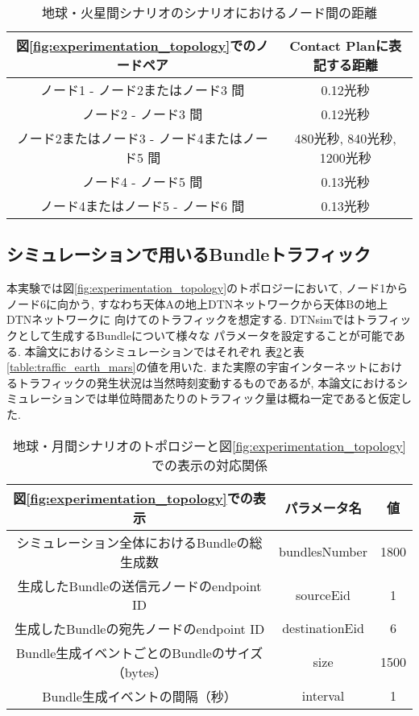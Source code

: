 \begin{table}[htbp]
    \centering
    \caption{地球・火星間シナリオのシナリオにおけるノード間の距離}
    \vspace{3mm}
    \begin{tabular}{cc}  \hline
        図\ref{fig:experimentation_topology}でのノードペア & Contact Planに表記する距離 \\ \hline
        ノード1 - ノード2またはノード3 間　& 0.12光秒 \\
        ノード2 - ノード3 間 & 0.12光秒 \\
        ノード2またはノード3 - ノード4またはノード5  間 & 480光秒, 840光秒, 1200光秒 \\
        ノード4 - ノード5  間 & 0.13光秒 \\
        ノード4またはノード5 - ノード6  間 & 0.13光秒 \\ \hline
    \end{tabular}
    \label{table:earth_mars_scenario_distance}
\end{table}

\subsection{シミュレーションで用いるBundleトラフィック}
\label{section:シミュレーションで用いるBundleトラフィック}
本実験では図\ref{fig:experimentation_topology}のトポロジーにおいて, 
ノード1からノード6に向かう, すなわち天体Aの地上DTNネットワークから天体Bの地上DTNネットワークに
向けてのトラフィックを想定する. DTNsimではトラフィックとして生成するBundleについて様々な
パラメータを設定することが可能である. 本論文におけるシミュレーションではそれぞれ
表\ref{table:traffic_earth_moon}と表\ref{table:traffic_earth_mars}の値を用いた. 
また実際の宇宙インターネットにおけるトラフィックの発生状況は当然時刻変動するものであるが, 
本論文におけるシミュレーションでは単位時間あたりのトラフィック量は概ね一定であると仮定した.

\begin{table}[htbp]
    \centering
    \caption{地球・月間シナリオのトポロジーと図\ref{fig:experimentation_topology}での表示の対応関係}
    \vspace{3mm}
    \begin{tabular}{ccc}  \hline
        図\ref{fig:experimentation_topology}での表示 & パラメータ名 & 値 \\ \hline
        シミュレーション全体におけるBundleの総生成数 & bundlesNumber & 1800 \\
        生成したBundleの送信元ノードのendpoint ID & sourceEid & 1 \\
        生成したBundleの宛先ノードのendpoint ID & destinationEid & 6 \\
        Bundle生成イベントごとのBundleのサイズ（bytes）& size & 1500\\
        Bundle生成イベントの間隔（秒）& interval & 1 \\ \hline
    \end{tabular}
    \label{table:traffic_earth_moon}
\end{table}

